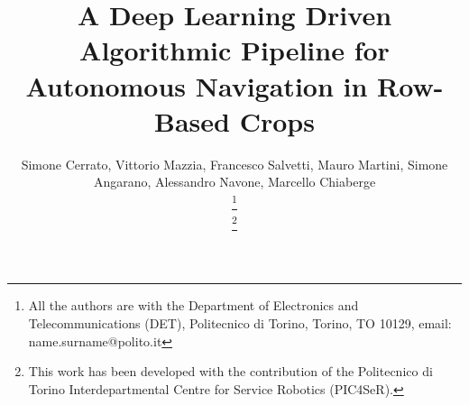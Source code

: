 \documentclass[journal]{IEEEtran}
\begin{document}
%
\title{A Deep Learning Driven Algorithmic Pipeline for Autonomous Navigation in Row-Based Crops}
%
%
%

\author{
Simone Cerrato,
Vittorio Mazzia,
Francesco Salvetti,
Mauro Martini,
Simone Angarano,
Alessandro Navone,
Marcello Chiaberge%

\thanks{All the authors are with the Department of Electronics and Telecommunications (DET), Politecnico di Torino, Torino, TO 10129, email: name.surname@polito.it}%

\thanks{This work has been developed with the contribution of the Politecnico di Torino Interdepartmental Centre for Service Robotics (PIC4SeR).}%
}

% 
%
\end{document}
